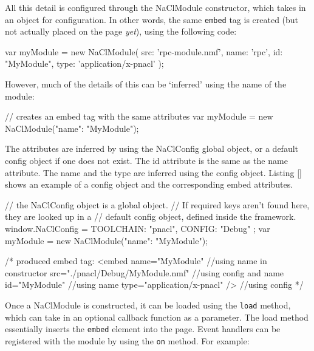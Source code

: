 All this detail is configured through the NaClModule constructor, which takes in an object for configuration. In other words, the same \lstinline{embed} tag is created (but not actually placed on the page \emph{yet}), using the following code:

\begin{code}
var myModule = new NaClModule({
  src: 'rpc-module.nmf', 
  name: 'rpc', 
  id: "MyModule", 
  type: 'application/x-pnacl'
});
\end{code}

However, much of the details of this can be `inferred' using the name of the module:

\begin{code}
// creates an embed tag with the same attributes
var myModule = new NaClModule({"name": "MyModule"});
\end{code}

The attributes are inferred by using the NaClConfig global object, or a default config object if one does not exist. The id attribute is the same as the name attribute. The name and the type are inferred using the config object. Listing \ref{} shows an example of a config object and the corresponding embed attributes.

\begin{code}
// the NaClConfig object is a global object. 
// If required keys aren't found here, they are looked up in a 
// default config object, defined inside the framework.
window.NaClConfig = {
  TOOLCHAIN: "pnacl",
  CONFIG: "Debug"
};
var myModule = new NaClModule({"name": "MyModule"});

/* produced embed tag:
<embed name="MyModule"                   //using name in constructor
       src="./pnacl/Debug/MyModule.nmf"  //using config and name
       id="MyModule"                     //using name
       type="application/x-pnacl" />     //using config
*/
\end{code}

Once a NaClModule is constructed, it can be loaded using the \lstinline{load} method, which can take in an optional callback function as a parameter. The load method essentially inserts the \lstinline{embed} element into the page. Event handlers can be registered with the module by using the \lstinline{on} method. For example:

